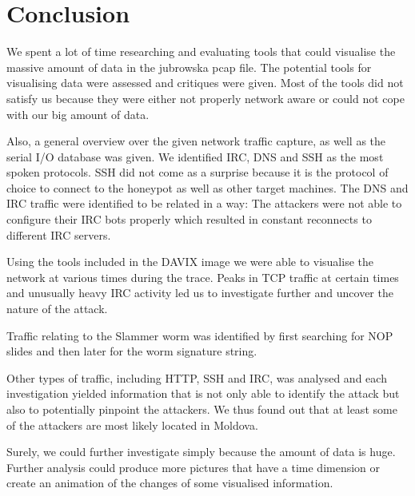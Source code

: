 \documentclass[a4paper,
    11pt,
    normalheadings,
    parindent,
    UKenglish,
    abstracton,
    ]{scrartcl}
\begin{document}
\section{Conclusion} \label{sec:conclusion}

We spent a lot of time researching and evaluating tools that could visualise the massive amount of data in the jubrowska pcap file.
The potential tools for visualising data were assessed and critiques were given.
Most of the tools did not satisfy us because they were either not properly network aware or could not cope with our big amount of data.

Also, a general overview over the given network traffic capture, as well as the serial I/O database was given.
We identified IRC, DNS and SSH as the most spoken protocols.
SSH did not come as a surprise because it is the protocol of choice to connect to the honeypot as well as other target machines.
The DNS and IRC traffic were identified to be related in a way: The attackers were not able to configure their IRC bots properly which resulted in constant reconnects to different IRC servers.


Using the tools included in the DAVIX image we were able to visualise the network at various times during the trace. Peaks in TCP traffic at certain times and unusually heavy IRC activity led us to investigate further and uncover the nature of the attack.

Traffic relating to the Slammer worm was identified by first searching for NOP slides and then later for the worm signature string.

Other types of traffic, including HTTP, SSH and IRC, was analysed and each investigation yielded information that is not only able to identify the attack but also to potentially pinpoint the attackers.
We thus found out that at least some of the attackers are most likely located in Moldova.

Surely, we could further investigate simply because the amount of data is huge.
Further analysis could produce more pictures that have a time dimension or create an animation of the changes of some visualised information.

% 
% 
% 
%
%
\end{document}
